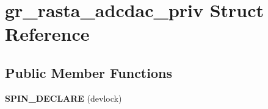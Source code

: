 \hypertarget{structgr__rasta__adcdac__priv}{}\section{gr\+\_\+rasta\+\_\+adcdac\+\_\+priv Struct Reference}
\label{structgr__rasta__adcdac__priv}
\subsection*{Public Member Functions}
\begin{DoxyCompactItemize}
\item 
\mbox{\label{structgr__rasta__adcdac__priv_ab7d2cdce4f93e63bad35c838e95e594c}} 
{\bfseries S\+P\+I\+N\+\_\+\+D\+E\+C\+L\+A\+RE} (devlock)
\end{DoxyCompactItemize}
